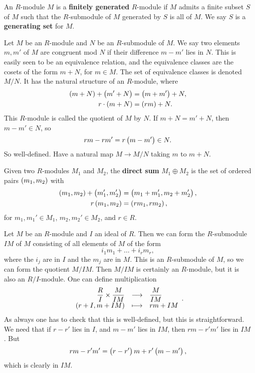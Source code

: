 \begin{definition}
An $ R $-module $ M $ is a \textbf{finitely generated} $ R $-module if $ M $ admits a finite subset $ S $ of $ M $ such that the $ R $-submodule of $ M $ generated by $ S $ is all of $ M $. We say $ S $ is a \textbf{generating set} for $ M $.
\end{definition}

\begin{definition}
Let $ M $ be an $ R $-module and $ N $ be an $ R $-submodule of $ M $. We say two elements $ m, m' $ of $ M $ are congruent mod $ N $ if their difference $ m - m' $ lies in $ N $. This is easily seen to be an equivalence relation, and the equivalence classes are the cosets of the form $ m + N $, for $ m \in M $. The set of equivalence classes is denoted $ M / N $. It has the natural structure of an $ R $-module, where
\begin{align*}
\br{m + N} + \br{m' + N} & = \br{m + m'} + N, \\
r \cdot \br{m + N} & = \br{rm} + N.
\end{align*}
This $ R $-module is called the quotient of $ M $ by $ N $. If $ m + N = m' + N $, then $ m - m' \in N $, so
$$ rm - rm' = r\br{m - m'} \in N. $$
So well-defined. Have a natural map $ M \to M / N $ taking $ m $ to $ m + N $.
\end{definition}

\begin{definition}
Given two $ R $-modules $ M_1 $ and $ M_2 $, the \textbf{direct sum} $ M_1 \oplus M_2 $ is the set of ordered pairs $ \br{m_1, m_2} $ with
\begin{align*}
\br{m_1, m_2} + \br{m_1', m_2'} & = \br{m_1 + m_1', m_2 + m_2'}, \\
r\br{m_1, m_2} & = \br{rm_1, rm_2},
\end{align*}
for $ m_1, m_1' \in M_1 $, $ m_2, m_2' \in M_2 $, and $ r \in R $.
\end{definition}

\pagebreak

\begin{example*}
Let $ M $ be an $ R $-module and $ I $ an ideal of $ R $. Then we can form the $ R $-submodule $ IM $ of $ M $ consisting of all elements of $ M $ of the form
$$ i_1m_1 + \dots + i_rm_r, $$
where the $ i_j $ are in $ I $ and the $ m_j $ are in $ M $. This is an $ R $-submodule of $ M $, so we can form the quotient $ M / IM $. Then $ M / IM $ is certainly an $ R $-module, but it is also an $ R / I $-module. One can define multiplication
$$ \function{\dfrac{R}{I} \times \dfrac{M}{IM}}{\dfrac{M}{IM}}{\br{r + I, m + IM}}{rm + IM}. $$
As always one has to check that this is well-defined, but this is straightforward. We need that if $ r - r' $ lies in $ I $, and $ m - m' $ lies in $ IM $, then $ rm - r'm' $ lies in $ IM $. But
$$ rm - r'm' = \br{r - r'}m + r'\br{m - m'}, $$
which is clearly in $ IM $.
\end{example*}

